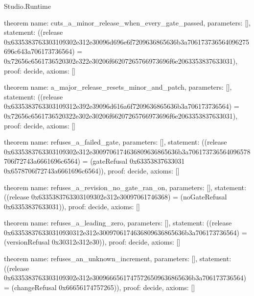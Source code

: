 \begin{lexlean}{Studio.Runtime}
\begin{semanticmodule}
theorem{
  name: cuts_a_minor_release_when_every_gate_passed,
  parameters: [],
  statement: ((release 0x6335383763303109302e312e30096d696e6f7209636865636b3a706173736564096275696c643a706173736564) = 0x72656c6561736520302e322e30206f66207265766973696f6e2063353837633031),
  proof: decide{},
  axioms: []
}

theorem{
  name: a_major_release_resets_minor_and_patch,
  parameters: [],
  statement: ((release 0x6335383763303109312e392e39096d616a6f7209636865636b3a706173736564) = 0x72656c6561736520322e302e30206f66207265766973696f6e2063353837633031),
  proof: decide{},
  axioms: []
}

theorem{
  name: refuses_a_failed_gate,
  parameters: [],
  statement: ((release 0x6335383763303109302e312e3009706174636809636865636b3a706173736564096578706f72743a6661696c6564) = (gateRefusal 0x63353837633031 0x6578706f72743a6661696c6564)),
  proof: decide{},
  axioms: []
}

theorem{
  name: refuses_a_revision_no_gate_ran_on,
  parameters: [],
  statement: ((release 0x6335383763303109302e312e30097061746368) = (noGateRefusal 0x63353837633031)),
  proof: decide{},
  axioms: []
}

theorem{
  name: refuses_a_leading_zero,
  parameters: [],
  statement: ((release 0x633538376330310930312e312e3009706174636809636865636b3a706173736564) = (versionRefusal 0x30312e312e30)),
  proof: decide{},
  axioms: []
}

theorem{
  name: refuses_an_unknown_increment,
  parameters: [],
  statement: ((release 0x6335383763303109302e312e30096665617475726509636865636b3a706173736564) = (changeRefusal 0x66656174757265)),
  proof: decide{},
  axioms: []
}
\end{semanticmodule}
\end{lexlean}
